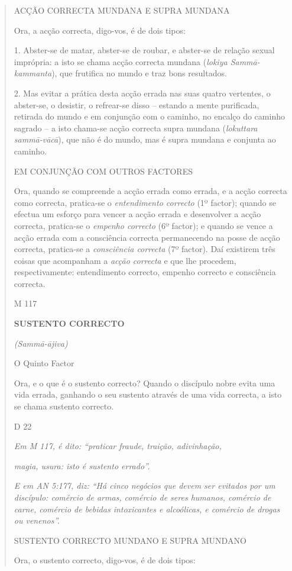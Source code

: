 \begin{quote}
ACÇÃO CORRECTA MUNDANA E SUPRA MUNDANA

Ora, a acção correcta, digo-vos, é de dois tipos:

1. Abster-se de matar, abster-se de roubar, e abster-se de relação sexual imprópria: a isto se chama acção correcta mundana (\emph{lokiya Sammā-kammanta}), que frutifica no mundo e traz bons resultados.

2. Mas evitar a prática desta acção errada nas suas quatro vertentes, o abster-se, o desistir, o refrear-se disso -- estando a mente purificada, retirada do mundo e em conjunção com o caminho, no encalço do caminho sagrado -- a isto chama-se acção correcta supra mundana (\emph{lokuttara sammā-vācā}), que não é do mundo, mas é supra mundana e conjunta ao caminho.

EM CONJUNÇÃO COM OUTROS FACTORES

Ora, quando se compreende a acção errada como errada, e a acção correcta como correcta, pratica-se o \emph{entendimento correcto} (1º factor); quando se efectua um esforço para vencer a acção errada e desenvolver a acção correcta, pratica-se o \emph{empenho correcto} (6º factor); e quando se vence a acção errada com a consciência correcta permanecendo na posse de acção correcta, pratica-se a \emph{consciência correcta} (7º factor). Daí existirem três coisas que acompanham a \emph{acção correcta} e que lhe procedem, respectivamente: entendimento correcto, empenho correcto e consciência correcta.

M 117

\textbf{SUSTENTO CORRECTO}

\emph{(Sammā-ājiva)}

O Quinto Factor

Ora, e o que é o sustento correcto? Quando o discípulo nobre evita uma vida errada, ganhando o seu sustento através de uma vida correcta, a isto se chama sustento correcto.

D 22

\emph{Em M 117, é dito: ``praticar fraude, traição, adivinhação,}

\emph{magia, usura: isto é sustento errado''.}

\emph{E em AN 5:177, diz: ``Há cinco negócios que devem ser evitados por um discípulo: comércio de armas, comércio de seres humanos, comércio de carne, comércio de bebidas intoxicantes e alcoólicas, e comércio de drogas ou venenos''.}

SUSTENTO CORRECTO MUNDANO E SUPRA MUNDANO

Ora, o sustento correcto, digo-vos, é de dois tipos:


\end{quote}
